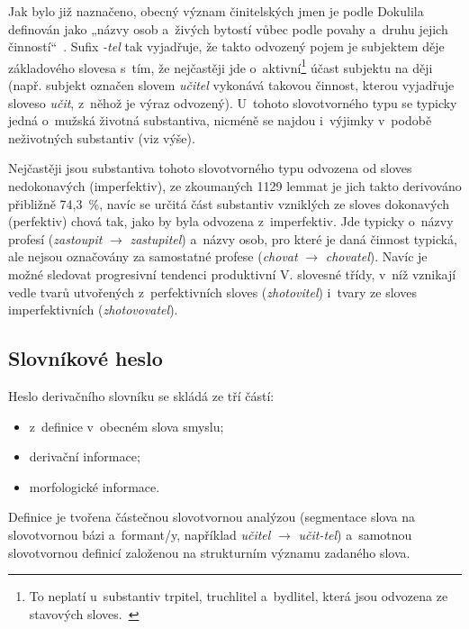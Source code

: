 Jak bylo již naznačeno, obecný význam činitelských jmen je podle
Dokulila definován jako „názvy osob a~živých bytostí vůbec podle povahy
a~druhu jejich činností``~\parencite[17]{dokulil67}. Sufix \emph{-tel}
tak vyjadřuje, že takto odvozený pojem je subjektem děje základového
slovesa s~tím, že nejčastěji jde
o~aktivní\footnote{To neplatí u~substantiv trpitel, truchlitel a~bydlitel, která jsou odvozena ze stavových sloves.~\parencite[17]{dokulil67}}
účast subjektu na ději (např. subjekt označen slovem \emph{učitel}
vykonává takovou činnost, kterou vyjadřuje sloveso \emph{učit}, z~něhož
je výraz odvozený). U~tohoto slovotvorného typu se typicky jedná
o~mužská životná substantiva, nicméně se najdou i~výjimky v~podobě
neživotných substantiv (viz výše).~\parencite{simandl2016}

Nejčastěji jsou substantiva tohoto slovotvorného typu odvozena od sloves
nedokonavých (imperfektiv), ze zkoumaných 1129 lemmat je jich takto
derivováno přibližně 74,3~\%, navíc se určitá část substantiv vzniklých
ze sloves dokonavých (perfektiv) chová tak, jako by byla odvozena
z~imperfektiv. Jde typicky o~názvy profesí (\emph{zastoupit}
$\rightarrow$ \emph{zastupitel}) a~názvy osob, pro které je daná
činnost typická, ale nejsou označovány za samostatné profese
(\emph{chovat} $\rightarrow$ \emph{chovatel}). Navíc je možné
sledovat progresivní tendenci produktivní V. slovesné třídy, v~níž
vznikají vedle tvarů utvořených z~perfektivních sloves
(\emph{zhotovitel}) i~tvary ze sloves imperfektivních
(\emph{zhotovovatel}).~\parencite{adri}

\hypertarget{slovnuxedkovuxe9-heslo}{%
\subsection{Slovníkové heslo}\label{slovnuxedkovuxe9-heslo}}

Heslo derivačního slovníku se skládá ze tří částí:

\begin{itemize}
\tightlist
\item
  z~definice v~obecném slova smyslu;
\item
  derivační informace;
\item
  morfologické informace.
\end{itemize}

Definice je tvořena částečnou slovotvornou analýzou (segmentace slova na
slovotvornou bázi a~formant/y, například \emph{učitel} $\rightarrow$
\emph{učit-tel}) a~samotnou slovotvornou definicí založenou na
strukturním významu zadaného slova.

